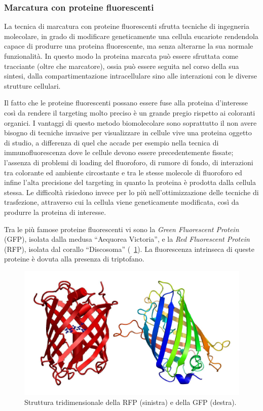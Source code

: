 \subsubsection*{Marcatura con proteine fluorescenti}
La tecnica di marcatura con proteine fluorescenti sfrutta tecniche di ingegneria molecolare, in grado di modificare geneticamente una cellula eucariote rendendola capace di produrre una proteina fluorescente, ma senza alterarne la sua normale funzionalità. 
In questo modo la proteina marcata può essere sfruttata come tracciante (oltre che marcatore), ossia può essere seguita nel corso della sua sintesi, dalla compartimentazione intracellulare sino alle interazioni con le diverse strutture cellulari.

Il fatto che le proteine fluorescenti possano essere fuse alla proteina d'interesse così da rendere il targeting molto preciso è un grande pregio rispetto ai coloranti organici. 
I vantaggi di questo metodo biomolecolare sono soprattutto il non avere bisogno di tecniche invasive per visualizzare in cellule vive una proteina oggetto di studio, a differenza di quel che accade per esempio nella tecnica di immunofluorescenza dove le cellule devono essere precedentemente fissate; l'assenza di problemi di loading del fluoroforo, di rumore di fondo, di interazioni tra colorante ed ambiente circostante e tra le stesse molecole di fluoroforo ed infine l'alta precisione del targeting in quanto la proteina è prodotta dalla cellula stessa. 
Le difficoltà risiedono invece per lo più nell'ottimizzazione delle tecniche di trasfezione, attraverso cui la cellula viene geneticamente modificata, così da produrre la proteina di interesse.

Tra le più famose proteine fluorescenti vi sono la \textit{Green Fluorescent Protein} (GFP), isolata dalla medusa ``Aequorea Victoria'', e la \textit{Red Fluorescent Protein} (RFP), isolata dal corallo ``Discosoma'' (\figurename~\ref{fig:proteine}). 
La fluorescenza intrinseca di queste proteine è dovuta alla presenza di triptofano.

\begin{figure}
 \centering
 \includegraphics[scale=.50]{img/CAP1proteine.png}
 \caption{\small{ Struttura tridimensionale della RFP (sinistra) e della GFP (destra).}}
 \label{fig:proteine}
\end{figure}

